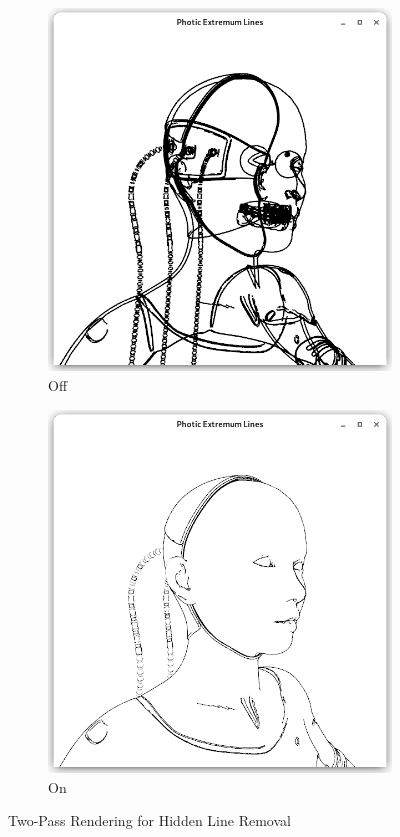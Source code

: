 \documentclass[9pt,fleqn,twoside,twocolumn]{stdglobal}
\begin{document}
  \begin{figure}
    \centering
    \begin{subfigure}[b]{0.49\linewidth}
      \centering
      \includegraphics[width=\textwidth,trim={15px 15 15 50},clip]{images/cyborg-contour-pel-hidden-shader.png}
      \caption{Off}
    \end{subfigure}
    \begin{subfigure}[b]{0.49\linewidth}
      \centering
      \includegraphics[width=\textwidth,trim={15px 15 15 50},clip]{images/cyborg-contour-pel-shader.png}
      \caption{On}
    \end{subfigure}
    \caption{Two-Pass Rendering for Hidden Line Removal}
  \end{figure}
\end{document}
